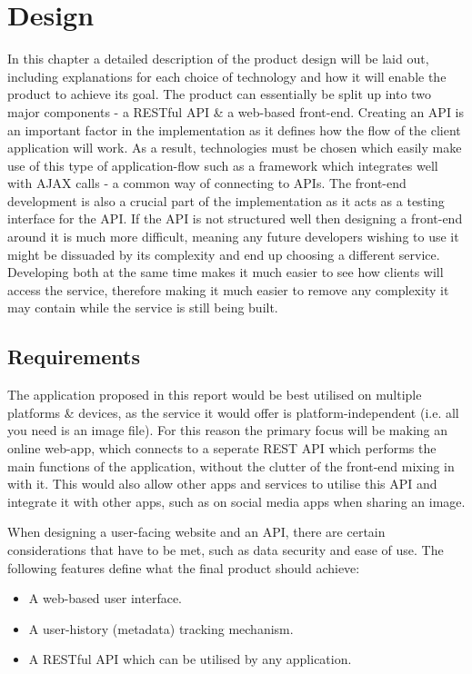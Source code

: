 \documentclass[a4paper,12pt]{report}
\begin{document}
\chapter{Design}
  In this chapter a detailed description of the product design will be laid out, including explanations for each choice of technology and how it will enable the product to achieve its goal. The product can essentially be split up into two major components - a RESTful API \& a web-based front-end. Creating an API is an important factor in the implementation as it defines how the flow of the client application will work. As a result, technologies must be chosen which easily make use of this type of application-flow such as a framework which integrates well with AJAX calls - a common way of connecting to APIs. The front-end development is also a crucial part of the implementation as it acts as a testing interface for the API. If the API is not structured well then designing a front-end around it is much more difficult, meaning any future developers wishing to use it might be dissuaded by its complexity and end up choosing a different service. Developing both at the same time makes it much easier to see how clients will access the service, therefore making it much easier to remove any complexity it may contain while the service is still being built.

  \section{Requirements} \label{sec:requirements}
    The application proposed in this report would be best utilised on multiple platforms \& devices, as the service it would offer is platform-independent (i.e. all you need is an image file). For this reason the primary focus will be making an online web-app, which connects to a seperate REST \citep{fielding2000architectural} API which performs the main functions of the application, without the clutter of the front-end mixing in with it. This would also allow other apps and services to utilise this API and integrate it with other apps, such as on social media apps when sharing an image.

    When designing a user-facing website and an API, there are certain considerations that have to be met, such as data security and ease of use. The following features define what the final product should achieve:

    \begin{itemize}
      \item A web-based user interface.
      \item A user-history (metadata) tracking mechanism.
      \item A RESTful API which can be utilised by any application.
    \end{itemize}
\end{document}

